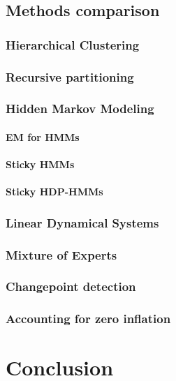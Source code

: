 \documentclass{report}
\begin{document}
\section{Methods comparison}

\subsection{Hierarchical Clustering}

\subsection{Recursive partitioning}

\subsection{Hidden Markov Modeling}

\subsubsection{EM for HMMs}

\subsubsection{Sticky HMMs}

\subsubsection{Sticky HDP-HMMs}

\subsection{Linear Dynamical Systems}

\subsection{Mixture of Experts}

\subsection{Changepoint detection}

\subsection{Accounting for zero inflation}

\chapter{Conclusion}



\end{document}
